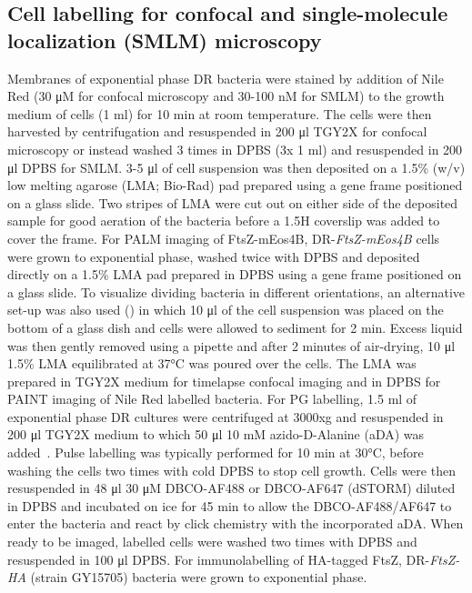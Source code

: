 \subsection{Cell labelling for confocal and single-molecule localization (SMLM) microscopy}

Membranes of exponential phase DR bacteria were stained by addition of Nile Red (30 μM for confocal microscopy and 30-100 nM for SMLM) to the growth medium of cells (1 ml) for 10 min at room temperature.
The cells were then harvested by centrifugation and resuspended in 200 μl TGY2X for confocal microscopy or instead washed 3 times in DPBS (3x 1 ml) and resuspended in 200 μl DPBS for SMLM.
3-5 μl of cell suspension was then deposited on a 1.5\% (w/v) low melting agarose (LMA; Bio-Rad) pad prepared using a gene frame positioned on a glass slide.
Two stripes of LMA were cut out on either side of the deposited sample for good aeration of the bacteria before a 1.5H coverslip was added to cover the frame.
For PALM imaging of FtsZ-mEos4B, DR-\textit{FtsZ-mEos4B} cells were grown to exponential phase, washed twice with DPBS and deposited directly on a 1.5\% LMA pad prepared in DPBS using a gene frame positioned on a glass slide.
To visualize dividing bacteria in different orientations, an alternative set-up was also used () in which 10 μl of the cell suspension was placed on the bottom of a glass dish and cells were allowed to sediment for 2 min.
Excess liquid was then gently removed using a pipette and after 2 minutes of air-drying, 10 μl 1.5\% LMA equilibrated at 37°C was poured over the cells.
The LMA was prepared in TGY2X medium for timelapse confocal imaging and in DPBS for PAINT imaging of Nile Red labelled bacteria.
For PG labelling, 1.5 ml of exponential phase DR cultures were centrifuged at 3000xg and resuspended in 200 μl TGY2X medium to which 50 μl 10 mM azido-D-Alanine (aDA) was added~\cite{trouveNanoscaleDynamicsPeptidoglycan2021,trouveMetabolicBiorthogonalLabeling2021}.
Pulse labelling was typically performed for 10 min at 30°C, before washing the cells two times with cold DPBS to stop cell growth.
Cells were then resuspended in 48 μl 30 μM DBCO-AF488 or DBCO-AF647 (dSTORM) diluted in DPBS and incubated on ice for 45 min to allow the DBCO-AF488/AF647 to enter the bacteria and react by click chemistry with the incorporated aDA.
When ready to be imaged, labelled cells were washed two times with DPBS and resuspended in 100 μl DPBS.
For immunolabelling of HA-tagged FtsZ, DR-\textit{FtsZ-HA} (strain GY15705) bacteria were grown to exponential phase.
